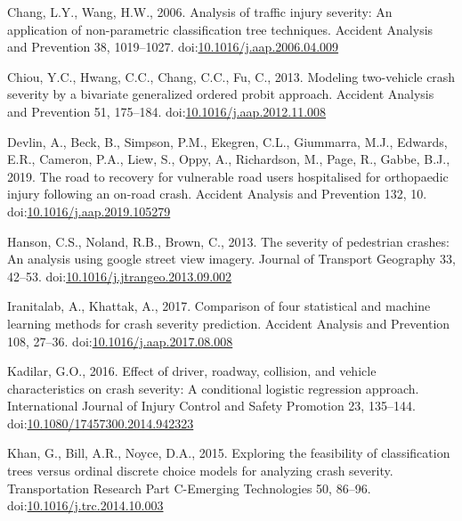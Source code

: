\documentclass[]{elsarticle} %
\begin{document}
\hypertarget{refs}{}
\leavevmode\hypertarget{ref-Chang2006analysis}{}%
Chang, L.Y., Wang, H.W., 2006. Analysis of traffic injury severity: An
application of non-parametric classification tree techniques. Accident
Analysis and Prevention 38, 1019--1027.
doi:\href{https://doi.org/10.1016/j.aap.2006.04.009}{10.1016/j.aap.2006.04.009}

\leavevmode\hypertarget{ref-Chiou2013modeling}{}%
Chiou, Y.C., Hwang, C.C., Chang, C.C., Fu, C., 2013. Modeling
two-vehicle crash severity by a bivariate generalized ordered probit
approach. Accident Analysis and Prevention 51, 175--184.
doi:\href{https://doi.org/10.1016/j.aap.2012.11.008}{10.1016/j.aap.2012.11.008}

\leavevmode\hypertarget{ref-Devlin2019road}{}%
Devlin, A., Beck, B., Simpson, P.M., Ekegren, C.L., Giummarra, M.J.,
Edwards, E.R., Cameron, P.A., Liew, S., Oppy, A., Richardson, M., Page,
R., Gabbe, B.J., 2019. The road to recovery for vulnerable road users
hospitalised for orthopaedic injury following an on-road crash. Accident
Analysis and Prevention 132, 10.
doi:\href{https://doi.org/10.1016/j.aap.2019.105279}{10.1016/j.aap.2019.105279}

\leavevmode\hypertarget{ref-Hanson2013severity}{}%
Hanson, C.S., Noland, R.B., Brown, C., 2013. The severity of pedestrian
crashes: An analysis using google street view imagery. Journal of
Transport Geography 33, 42--53.
doi:\href{https://doi.org/10.1016/j.jtrangeo.2013.09.002}{10.1016/j.jtrangeo.2013.09.002}

\leavevmode\hypertarget{ref-Iranitalab2017comparison}{}%
Iranitalab, A., Khattak, A., 2017. Comparison of four statistical and
machine learning methods for crash severity prediction. Accident
Analysis and Prevention 108, 27--36.
doi:\href{https://doi.org/10.1016/j.aap.2017.08.008}{10.1016/j.aap.2017.08.008}

\leavevmode\hypertarget{ref-Kadilar2016effect}{}%
Kadilar, G.O., 2016. Effect of driver, roadway, collision, and vehicle
characteristics on crash severity: A conditional logistic regression
approach. International Journal of Injury Control and Safety Promotion
23, 135--144.
doi:\href{https://doi.org/10.1080/17457300.2014.942323}{10.1080/17457300.2014.942323}

\leavevmode\hypertarget{ref-Khan2015exploring}{}%
Khan, G., Bill, A.R., Noyce, D.A., 2015. Exploring the feasibility of
classification trees versus ordinal discrete choice models for analyzing
crash severity. Transportation Research Part C-Emerging Technologies 50,
86--96.
doi:\href{https://doi.org/10.1016/j.trc.2014.10.003}{10.1016/j.trc.2014.10.003}
\end{document}
